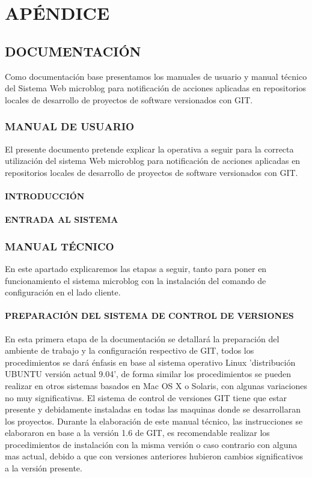 

%
\chapter{APÉNDICE}
\section{DOCUMENTACIÓN}
Como documentación base presentamos los manuales de usuario y manual técnico del Sistema Web microblog para notificación de acciones aplicadas en repositorios locales de desarrollo de proyectos de software versionados con GIT. 
\subsection{MANUAL DE USUARIO}
El presente documento pretende explicar la operativa a seguir para la correcta utilización del sistema Web microblog para notificación de acciones aplicadas en repositorios locales de desarrollo de proyectos de software versionados con GIT.
\subsubsection{INTRODUCCIÓN}
\subsubsection{ENTRADA AL SISTEMA}

\subsection{MANUAL TÉCNICO}
En este apartado explicaremos las etapas a seguir, tanto para poner en funcionamiento el sistema microblog con la instalación del comando de configuración en el lado cliente.
\subsubsection{PREPARACIÓN DEL SISTEMA DE CONTROL DE VERSIONES}

En esta primera etapa de la documentación se detallará la preparación del ambiente de trabajo y la configuración respectivo de GIT, todos los procedimientos se dará énfasis en base al sistema operativo Linux  'distribución UBUNTU versión actual 9.04', de forma similar los procedimientos se pueden realizar en otros sistemas basados en Mac OS X o Solaris, con algunas variaciones no muy significativas.
El sistema de control de versiones GIT tiene que estar presente y debidamente instaladas en todas las maquinas donde se desarrollaran los proyectos.
Durante la elaboración de este manual técnico, las instrucciones se elaboraron en base a la versión 1.6 de GIT, es recomendable realizar los procedimientos de instalación con la misma
versión o caso contrario con alguna mas actual, debido a que con versiones anteriores hubieron cambios significativos a la versión presente. 
